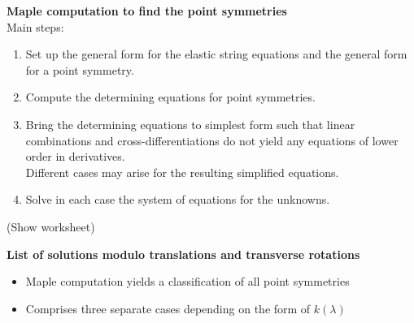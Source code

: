 \documentclass[landscape]{slides}
\begin{document}
\newpage

\textbf{Maple computation to find the point symmetries}
\hfil\\

Main steps:
\begin{enumerate}
\item 
Set up the general form for the elastic string equations 
and the general form for a point symmetry.
\\
\item
Compute the determining equations for point symmetries.
\\
\item
Bring the determining equations to simplest form such that 
linear combinations and cross-differentiations do not yield 
any equations of lower order in derivatives.\\

Different cases may arise for the resulting simplified equations. 
\\
\item
Solve in each case the system of equations for the unknowns.
\\
\end{enumerate}
\hfil


(Show worksheet)

\newpage
\begin{center}
\textbf{List of solutions modulo translations and transverse rotations}
\end{center}

\begin{itemize}
\item
Maple computation yields a classification of all point symmetries 
\item
Comprises three separate cases depending on the form of $k(\lambda)$
\end{itemize}
\hfil
\end{document}
